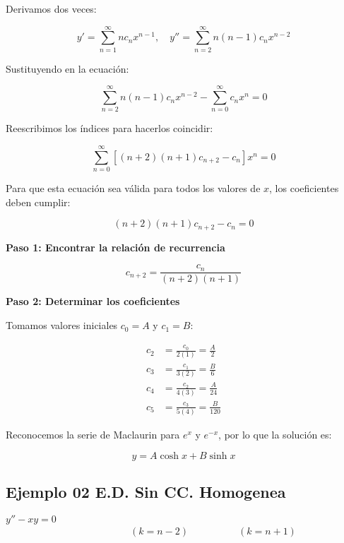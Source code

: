 Derivamos dos veces:

\begin{equation}
y' = \sum_{n=1}^{\infty} n c_n x^{n-1}, \quad y'' = \sum_{n=2}^{\infty} n(n-1) c_n x^{n-2}
\end{equation}

Sustituyendo en la ecuación:

\begin{equation}
\sum_{n=2}^{\infty} n(n-1) c_n x^{n-2} - \sum_{n=0}^{\infty} c_n x^n = 0
\end{equation}

Reescribimos los índices para hacerlos coincidir:

\begin{equation}
\sum_{n=0}^{\infty} \left[ (n+2)(n+1) c_{n+2} - c_n \right] x^n = 0
\end{equation}

Para que esta ecuación sea válida para todos los valores de \( x \), los coeficientes deben cumplir:

\begin{equation}
(n+2)(n+1) c_{n+2} - c_n = 0
\end{equation}

\textbf{Paso 1: Encontrar la relación de recurrencia}

\begin{equation}
c_{n+2} = \frac{c_n}{(n+2)(n+1)}
\end{equation}

\textbf{Paso 2: Determinar los coeficientes}

Tomamos valores iniciales \( c_0 = A \) y \( c_1 = B \):

\begin{align*}
c_2 &= \frac{c_0}{2(1)} = \frac{A}{2} \\
c_3 &= \frac{c_1}{3(2)} = \frac{B}{6} \\
c_4 &= \frac{c_2}{4(3)} = \frac{A}{24} \\
c_5 &= \frac{c_3}{5(4)} = \frac{B}{120}
\end{align*}

Reconocemos la serie de Maclaurin para \( e^x \) y \( e^{-x} \), por lo que la solución es:

\begin{equation}
y = A \cosh x + B \sinh x
\end{equation}


\subsection{Ejemplo 02 E.D. Sin CC. Homogenea}
\( y'' - xy = 0 \)
\begin{gather*}
\quad \quad \quad \quad \quad \quad ( k = n-2) \quad \quad \quad \quad \quad ( k = n+1) \\
\end{gather*}


